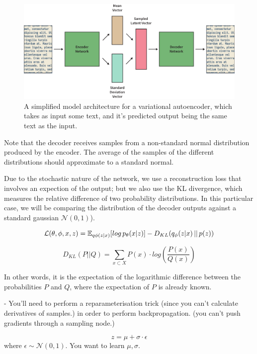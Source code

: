 \documentclass[12pt,twoside]{report}
\begin{document}
\begin{figure}[!ht]
      
	\centering
	\includegraphics[width=150mm]{diagrams/variational_autoencoders.pdf}
	\caption{A simplified model architecture for a variational autoencoder, which takes as input some text, and it's predicted output being the same text as the input.\label{vae}}
  \end{figure}

  Note that the decoder receives samples from a non-standard normal distribution produced by the encoder. The average of the samples of the different distributions should approximate to a standard normal.
  
  Due to the stochastic nature of the network, we use a reconstruction loss that involves an expection of the output; but we also use the KL divergence, which  measures the relative difference of two probability distributions. In this particular case, we will be comparing the distribution of the decoder outputs against a standard gaussian $ \mathcal{N}(0,1)$).
  
  $$\mathcal{L}(\theta, \phi, x, z) = \mathbb{E}_{q \phi (z|x)}[log \thinspace p_{\theta}(x|z)] - D_{KL}(q_{\phi}(z|x)\thinspace||\thinspace p(z)) $$

$$
D_{KL}(P ||Q) = \sum_{x \subset X} P(x) \cdot log (\frac{P(x)}{Q(x)})
$$

In other words, it is the expectation of the logarithmic difference between the probabilities $P$ and $Q$, where the expectation of $P$ is already known.

- You'll need to perform a reparameterisation trick (since you can't calculate derivatives of samples.) in order to perform backpropagation. (you can't push gradients through a sampling node.)
  
$$z = \mu + \sigma \cdot \epsilon $$ where $\epsilon \sim \mathcal{N}(0,1)$. You want to learn $\mu, \sigma$.
\end{document}
